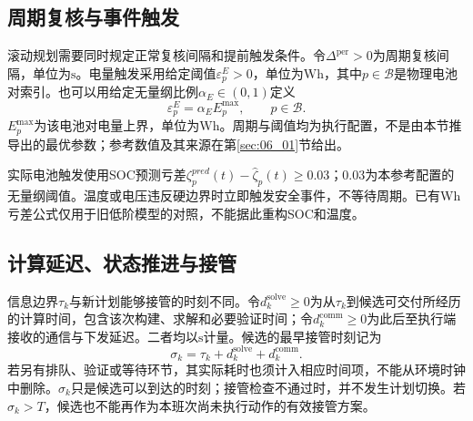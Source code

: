 \subsection{周期复核与事件触发}

滚动规划需要同时规定正常复核间隔和提前触发条件。令$\Delta^{\mathrm{per}}>0$为周期复核间隔，单位为$\mathrm s$。电量触发采用给定阈值$\varepsilon_p^E>0$，单位为$\mathrm{Wh}$，其中$p\in\mathcal B$是物理电池对索引。也可以用给定无量纲比例$\alpha_E\in(0,1)$定义
\begin{equation}
 \varepsilon_p^E=\alpha_E E_p^{\max},
 \qquad p\in\mathcal B.
 \label{s0509:energy_trigger_parameter}
\end{equation}
$E_p^{\max}$为该电池对电量上界，单位为$\mathrm{Wh}$。周期与阈值均为执行配置，不是由本节推导出的最优参数；参考数值及其来源在第\ref{sec:06_01}节给出。

实际电池触发使用SOC预测亏差$\zeta_p^{pred}(t)-\widehat\zeta_p(t)\ge0.03$；0.03为本参考配置的无量纲阈值。温度或电压违反硬边界时立即触发安全事件，不等待周期。已有Wh亏差公式仅用于旧低阶模型的对照，不能据此重构SOC和温度。

\subsection{计算延迟、状态推进与接管}

信息边界$\tau_k$与新计划能够接管的时刻不同。令$d_k^{\mathrm{solve}}\ge0$为从$\tau_k$到候选可交付所经历的计算时间，包含该次构建、求解和必要验证时间；令$d_k^{\mathrm{comm}}\ge0$为此后至执行端接收的通信与下发延迟。二者均以$\mathrm s$计量。候选的最早接管时刻记为
\begin{equation}
 \sigma_k=\tau_k+d_k^{\mathrm{solve}}+d_k^{\mathrm{comm}}.
 \label{s0509:takeover_time}
\end{equation}
若另有排队、验证或等待环节，其实际耗时也须计入相应时间项，不能从环境时钟中删除。$\sigma_k$只是候选可以到达的时刻；接管检查不通过时，并不发生计划切换。若$\sigma_k>T$，候选也不能再作为本班次尚未执行动作的有效接管方案。

